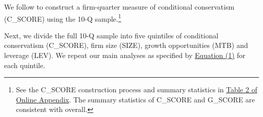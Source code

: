 \documentclass[letterpaper,11pt]{article}
\begin{document}
\begin{spacing}{1.5}
We follow  to construct a firm-quarter measure of conditional conservatism (C\_SCORE) using the 10-Q sample.\footnote{See the C\_SCORE construction process and summary statistics in \hyperref[oat2]{Table 2 of Online Appendix}. The summary statistics of C\_SCORE and G\_SCORE are consistent with  overall. }
\begin{comment}
Specifically, we run the following cross-sectional model for each fiscal year from 1993 to 2015:
\begin{equation} \label{eq3}
\begin{split}
EARN_{i,t} = \beta_0&+\beta_1NEG_{i,t}+\beta_2RET_{i,t}\\
&+\beta_3RET_{i,t}\times SIZE_{i,t}+\beta_4RET_{i,t}\times MTB_{i,t}+\beta_5RET_{i,t}\times LEV_{i,t}+\beta_6RET_{i,t}\times NEG_{i,t}\\
&+\beta_7RET_{i,t}\times NEG_{i,t}\times SIZE_{i,t}+\beta_8RET_{i,t}\times NEG_{i,t}\times MTB_{i,t}+\beta_9RET_{i,t}\times NEG_{i,t}\times LEV_{i,t}\\
&+\beta_{10}SIZE_{i,t}+\beta_{11}MTB_{i,t}+\beta_{12}LEV_{i,t}\\
&+\beta_{13}NEG_{i,t}\times SIZE_{i,t}+\beta_{14}NEG_{i,t}\times MTB_{i,t}+\beta_{15}NEG_{i,t}\times LEV_{i,t}+ \epsilon_{i,t}
\end{split}
\end{equation}
We obtain the estimates from Equation (3) and use them to calculate C\_SCORE and G\_SCORE following Equation (4) and Equation (5) respectively. C\_SCORE captures the incremental timeliness of bad news and measures conditional conservatism, with more positive value being more conditionally conservative. G\_SCORE captures the timeliness of good news.
\begin{equation}\label{eq4}
C\_SCORE_{i,t} = \beta_6+\beta_7SIZE_{i,t}+\beta_8MTB_{i,t}+\beta_9LEV_{i,t}
\end{equation}
\begin{equation}\label{eq5}
G\_SCORE_{i,t} = \beta_2+\beta_3SIZE_{i,t}+\beta_4MTB_{i,t}+\beta_5LEV_{i,t}
\end{equation}

The mean and standard errors of coefficients obtained from \hyperref[eq3]{Equation (3)} and the summary statistics of C\_SCORE and G\_SCORE (see \hyperref[oat2]{Table 2 of Online Appendix}) are consistent with \citeA{khanEstimationEmpiricalProperties2009} overall. 
\end{comment}
Next, we divide the full 10-Q sample into five quintiles of conditional conservatism (C\_SCORE), firm size (SIZE), growth opportunities (MTB) and leverage (LEV). We repeat our main analyses as specified by \hyperref[eq1]{Equation (1)} for each quintile.


\end{spacing}
\end{document}
